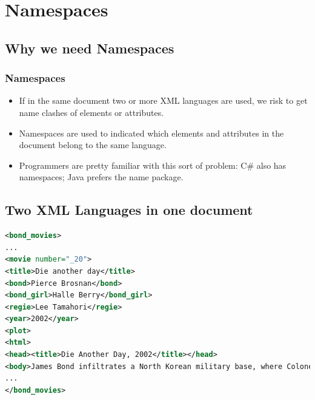 \chapter{Namespaces}
\section{Why we need Namespaces}
\subsection{Namespaces}
\begin{itemize}
\item If in the same document two or more XML languages are used, we risk to get name clashes of elements or attributes.
\item Namespaces are used to indicated which elements and attributes in the document belong to the same language.
\item Programmers are pretty familiar with this sort of problem: C\# also has namespaces; Java prefers the name package.
\end{itemize}

\section{Two XML Languages in one document}
\begin{lstlisting}[language=XML, caption={Where does the error occur?}]
<bond_movies>
...
<movie number="_20">
<title>Die another day</title>
<bond>Pierce Brosnan</bond>
<bond_girl>Halle Berry</bond_girl>
<regie>Lee Tamahori</regie>
<year>2002</year>
<plot>
<html>
<head><title>Die Another Day, 2002</title></head>
<body>James Bond infiltrates a North Korean military base, where Colonel Tan-Sun Moon is illegally trading African <i>conflict diamonds</i> for weaponry. After Moon's assistant Zao discovers Bond is a British agent, the colonel escapes in a hovercraft. Bond distracts the soldiers with an explosion, in which Zao's face is disfigured by diamond fragments. Bond pursues Moon in a second hovercraft. During the chase, Moon's hovercraft plunges down a waterfall, apparently killing him. Bond is captured by North Korean soldiers and imprisoned by the Colonel's father, General Moon. After 14 months of captivity and torture, Bond is traded for Zao in a prisoner exchange. He is sedated and taken to meet <b>M</b>, who informs him that his status as a <b>00 Agent</b> is suspended due to her belief that he may have leaked information under duress. Still bitter over Zao's release, Bond decides to complete his mission by evading MI6's security and travelling to Hong Kong, where he learns from his contact in the Chinese government that Zao was sighted in Cuba ...</body></html></plot> </movie>
...
</bond_movies>
\end{lstlisting}

